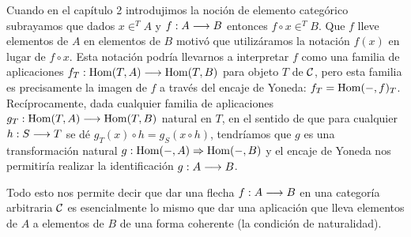 Cuando en el capítulo 2 introdujimos la noción
de elemento categórico subrayamos que dados $x \in^T A$ y
$f : A\longrightarrow B$ entonces $f \circ x \in^T B$.
Que $f$ lleve elementos de $A$ en elementos de $B$
motivó que utilizáramos la notación $f(x)$ en lugar de $f \circ x$.
Esta notación podría llevarnos a interpretar $f$ como una familia
de aplicaciones
$f_T : \operatorname{Hom}(T, A)\longrightarrow \operatorname{Hom}(T, B)$ para objeto $T$ de $\mathcal{C}$,
pero esta familia es precisamente
la imagen de $f$ a través del encaje de Yoneda: $f_T = \operatorname{Hom}(-, f)_T$.
Recíprocamente,
dada cualquier familia de aplicaciones
$g_T : \operatorname{Hom}(T, A)\longrightarrow \operatorname{Hom}(T, B)$ natural en $T$, en el sentido
de que para cualquier $h : S\longrightarrow T$ se dé
$g_T(x) \circ h = g_S(x \circ h)$, tendríamos que $g$ es una transformación
natural $g: \operatorname{Hom}(-, A)\Rightarrow \operatorname{Hom}(-, B)$ y el
encaje de Yoneda nos permitiría realizar la identificación $g : A\longrightarrow B$.

Todo esto nos permite decir que dar una flecha $f: A\longrightarrow B$ en una categoría
arbitraria $\mathcal{C}$ es esencialmente lo mismo que dar una aplicación que lleva
elementos de $A$ a elementos de $B$ de una forma coherente (la condición
de naturalidad).
